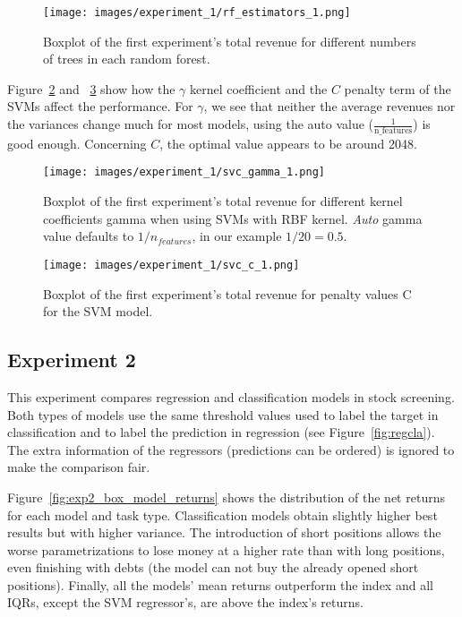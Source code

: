 \begin{figure}
    \centering
    \texttt{[image: images/experiment\_1/rf\_estimators\_1.png]}
    \caption{\small Boxplot of the first experiment's total revenue for different numbers of trees in each random forest.}
    \label{fig:exp1_box_rf_estimators}
\end{figure}

Figure~\ref{fig:exp1_box_svc_gamma} and ~\ref{fig:exp1_box_svc_c} show how the $\gamma$ kernel coefficient and the $C$ penalty term of the SVMs affect the performance. For $\gamma$, we see that neither the average revenues nor the variances change much  for most models, using the auto value ($\frac{1}{\text{n\_features}}$) is good enough. Concerning $C$, the optimal value appears to be around 2048.

\begin{figure}
    \centering
    \texttt{[image: images/experiment\_1/svc\_gamma\_1.png]}
    \caption{\small Boxplot of the first experiment's total revenue for different kernel coefficients gamma when using SVMs with RBF kernel. \textit{Auto} gamma value defaults to $1/n_{features}$, in our example $1/20=0.5$. }
    \label{fig:exp1_box_svc_gamma}
\end{figure}

\begin{figure}
    \centering
    \texttt{[image: images/experiment\_1/svc\_c\_1.png]}
    \caption{\small Boxplot of the first experiment's total revenue for penalty values C for the SVM model.}
    \label{fig:exp1_box_svc_c}
\end{figure}


\subsection{Experiment 2}

This experiment compares regression and classification models in stock screening. Both types of models use the same threshold values used to label the target in classification and to label the prediction in regression (see Figure~\ref{fig:regcla}). The extra information of the regressors (predictions can be ordered) is ignored to make the comparison fair. 

Figure~\ref{fig:exp2_box_model_returns} shows the distribution of the net returns for each model and task type.  Classification models obtain slightly higher best results but with higher variance. The introduction of short positions allows the worse parametrizations to lose money at a higher rate than with long positions, even finishing with debts (the model can not buy the already opened short positions). Finally, all the models' mean returns outperform the index and all IQRs, except the SVM regressor's, are above the index's returns.

